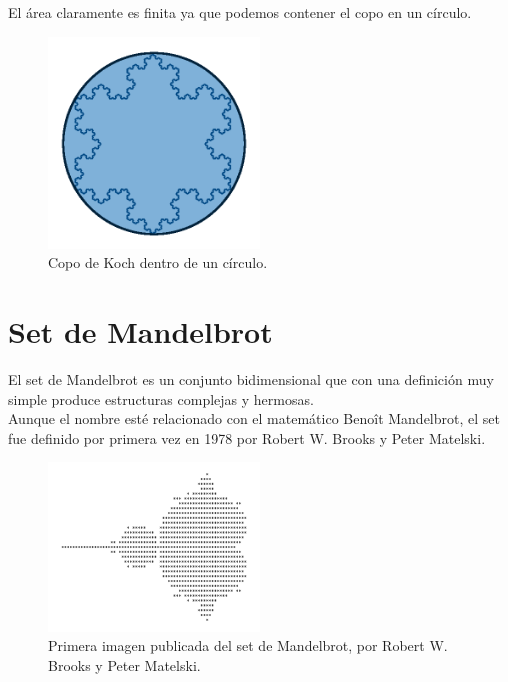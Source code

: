 \noindent El área claramente es finita ya que podemos contener el copo en un círculo.\\

\begin{figure}[H]
    \centering
    \includegraphics[width=0.5\textwidth]{figures/koch-snowflake-circle.png}
    \caption{Copo de Koch dentro de un círculo.}
    \label{fig:koch-snowflake-circle}
\end{figure}

\section{Set de Mandelbrot}

\noindent El set de Mandelbrot es un conjunto bidimensional que con una definición muy simple produce estructuras complejas y hermosas.\\

\noindent Aunque el nombre esté relacionado con el matemático Benoît Mandelbrot, el set fue definido por primera vez en 1978 por Robert W. Brooks y Peter Matelski.

\begin{figure}[H]
    \centering
    \includegraphics[width=0.5\textwidth]{figures/mandelbrot-set-first-picture.png}
    \caption{Primera imagen publicada del set de Mandelbrot, por Robert W. Brooks y Peter Matelski.}
    \label{fig:mandelbrot-set-first-picture}
\end{figure}

